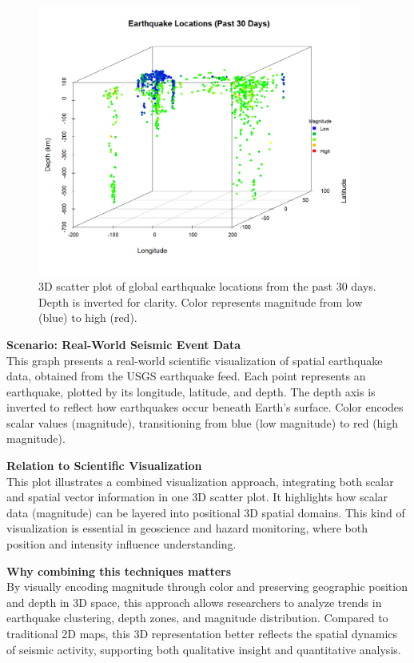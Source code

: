 \documentclass[11pt]{article}
\begin{document}
		\begin{figure}[H]
		\centering
		\includegraphics[width=0.95\textwidth]{earthquake_3d_plot_with_legend.png}
		\caption{3D scatter plot of global earthquake locations from the past 30 days. Depth is inverted for clarity. Color represents magnitude from low (blue) to high (red).}
		\label{fig:earthquake_3d}
	\end{figure}
	
	\vspace{1em}
	\noindent
	\textbf{Scenario: Real-World Seismic Event Data} \\
	This graph presents a real-world scientific visualization of spatial earthquake data, obtained from the USGS earthquake feed. Each point represents an earthquake, plotted by its longitude, latitude, and depth. The depth axis is inverted to reflect how earthquakes occur beneath Earth's surface. Color encodes scalar values (magnitude), transitioning from blue (low magnitude) to red (high magnitude).
	
	\vspace{0.5em}
	\noindent
	\textbf{Relation to Scientific Visualization} \\
	This plot illustrates a combined visualization approach, integrating both scalar and spatial vector information in one 3D scatter plot. It highlights how scalar data (magnitude) can be layered into positional 3D spatial domains. This kind of visualization is essential in geoscience and hazard monitoring, where both position and intensity influence understanding.
	
	\vspace{0.5em}
	\noindent
	\textbf{Why combining this techniques matters} \\
	By visually encoding magnitude through color and preserving geographic position and depth in 3D space, this approach allows researchers to analyze trends in earthquake clustering, depth zones, and magnitude distribution. Compared to traditional 2D maps, this 3D representation better reflects the spatial dynamics of seismic activity, supporting both qualitative insight and quantitative analysis.
	
\end{document}

